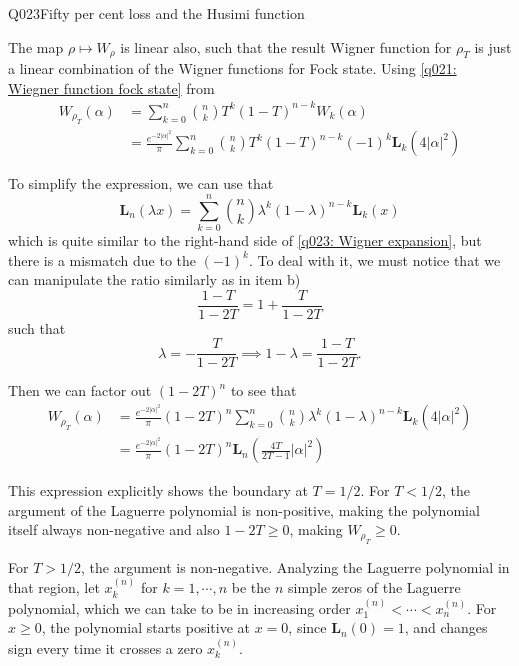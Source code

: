 \begin{entry}{Q023}{Fifty per cent loss and the Husimi function}
\begin{solution}[Part (c)]
The map $\rho\mapsto W_\rho$ is linear also, such that the result Wigner function for $\rho_T$ is just a linear combination of the Wigner functions for Fock state. Using \eqref{q021: Wiegner function fock state} from  
\begin{equation}
\begin{split}
    W_{\rho_T} (\alpha) &= \sum_{k=0}^{n}  \binom{n}{k}T^{k} (1-T)^{n-k} W_k (\alpha) \\
    &= \frac{e^{-2|\alpha|^2}}{\pi} \sum_{k=0}^{n}  \binom{n}{k}T^{k} (1-T)^{n-k} (-1)^k\mathbf{L}_k(4|\alpha|^2)
    \label{q023: Wigner expansion}
\end{split}
\end{equation}

To simplify the expression, we can use that
\begin{equation}
   \mathbf L_n(\lambda x)= \sum_{k=0}^n \binom{n}{k}\lambda^k(1-\lambda)^{n-k}\mathbf L_k(x)
\end{equation}
which is quite similar to the right-hand side of \eqref{q023: Wigner expansion}, but there is a mismatch due to the $(-1)^k$. To deal with it, we must notice that we can manipulate the ratio similarly as in item b) $$\frac{1-T}{1-2T}= 1 +\frac{T}{1-2T}$$
such that $$\lambda = -\frac{T}{1-2T} \implies 1- \lambda = \frac{1-T}{1-2T}.$$ 

Then we can factor out $(1-2T)^n$ to see that
\begin{equation}
\begin{split}
    W_{\rho_T} (\alpha) 
    &= \frac{e^{-2|\alpha|^2}}{\pi} (1-2T)^n \sum_{k=0}^{n}  \binom{n}{k}\lambda^{k} (1-\lambda)^{n-k} \mathbf{L}_k(4|\alpha|^2)\\
    &= \frac{e^{-2|\alpha|^2}}{\pi} (1-2T)^n  \mathbf{L}_n\left(\frac{4T}{2T-1} |\alpha|^2\right)
\end{split}
\end{equation}

This expression explicitly shows the boundary at $T=1/2$. For $T<1/2$, the argument of the Laguerre polynomial is non-positive, making the polynomial itself always non-negative and also $1-2T \geq 0$, making $W_{\rho_T} \geq 0.$ 

For $T>1/2$, the argument is non-negative. Analyzing the Laguerre polynomial in that region, let $x^{(n)}_k$ for $k=1,\cdots,n$ be the $n$ simple zeros of the Laguerre polynomial, which we can take to be in increasing order $x^{(n)}_1 < \cdots < x^{(n)}_n$.
For $x\geq 0$, the polynomial starts positive at $x=0$, since $\mathbf L_n(0)=1$, and changes sign every time it crosses a zero $x^{(n)}_k$.


\end{solution}
\end{entry}
